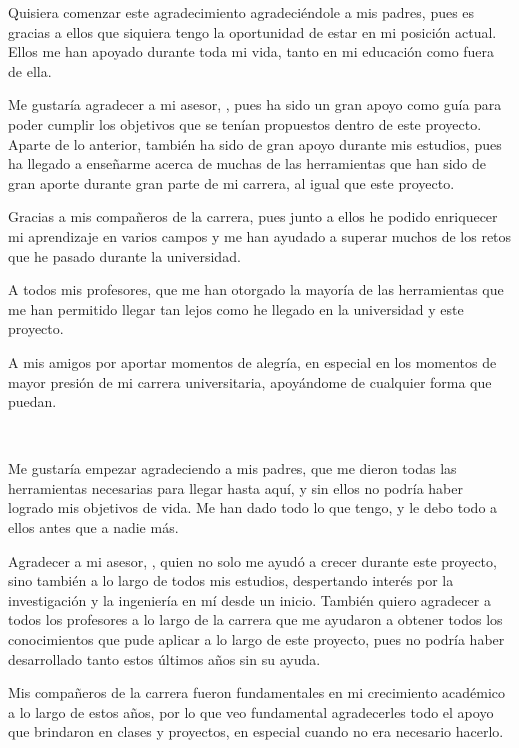 \begin{onehalfspacing} %
\justifying %

Quisiera comenzar este agradecimiento agradeciéndole a mis padres, pues es gracias a ellos que siquiera tengo la oportunidad de estar en mi posición actual. Ellos me han apoyado durante toda mi vida, tanto en mi educación como fuera de ella.

Me gustaría agradecer a mi asesor, \text{\Asesor}, pues ha sido un gran apoyo como guía para poder cumplir los objetivos que se tenían propuestos dentro de este proyecto. Aparte de lo anterior, también ha sido de gran apoyo durante mis estudios, pues ha llegado a enseñarme acerca de muchas de las herramientas que han sido de gran aporte durante gran parte de mi carrera, al igual que este proyecto.

Gracias a mis compañeros de la carrera, pues junto a ellos he podido enriquecer mi aprendizaje en varios campos y me han ayudado a superar muchos de los retos que he pasado durante la universidad.

A todos mis profesores, que me han otorgado la mayoría de las herramientas que me han permitido llegar tan lejos como he llegado en la universidad y este proyecto.

A mis amigos por aportar momentos de alegría, en especial en los momentos de mayor presión de mi carrera universitaria, apoyándome de cualquier forma que puedan.

\end{onehalfspacing}

\vspace{1.5cm} %
\begin{flushright}
\textbf{\thesisAuthorB} \\ %
\end{flushright}

\begin{onehalfspacing} %
\justifying %
Me gustaría empezar agradeciendo a mis padres, que me dieron todas las herramientas necesarias para llegar hasta aquí, y sin ellos no podría haber logrado mis objetivos de vida. Me han dado todo lo que tengo, y le debo todo a ellos antes que a nadie más. 

Agradecer a mi asesor, \text{\Asesor}, quien no solo me ayudó a crecer durante este proyecto, sino también a lo largo de todos mis estudios, despertando interés por la investigación y la ingeniería en mí desde un inicio.
También quiero agradecer a todos los profesores a lo largo de la carrera que me ayudaron a obtener todos los conocimientos que pude aplicar a lo largo de este proyecto, pues no podría haber desarrollado tanto estos últimos años sin su ayuda. 

Mis compañeros de la carrera fueron fundamentales en mi crecimiento académico a lo largo de estos años, por lo que veo fundamental agradecerles todo el apoyo que brindaron en clases y proyectos, en especial cuando no era necesario hacerlo.


\end{onehalfspacing}

